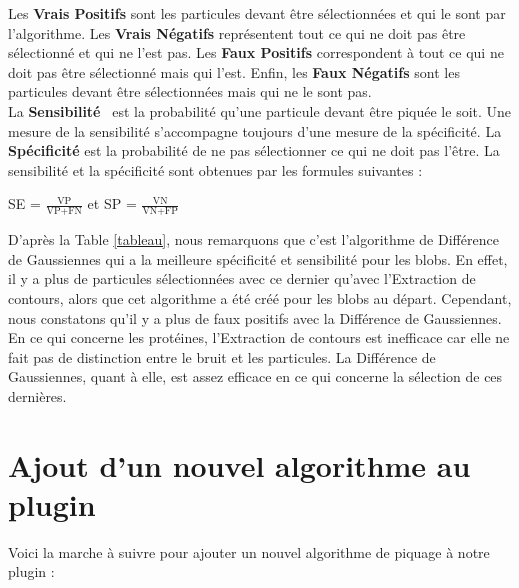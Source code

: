 \pagebreak

Les \textbf{Vrais Positifs} sont les particules devant être sélectionnées et qui le sont par l'algorithme. Les \textbf{Vrais Négatifs} représentent tout ce qui ne doit pas être sélectionné et qui ne l'est pas. Les \textbf{Faux Positifs} correspondent à tout ce qui ne doit pas être sélectionné mais qui l'est. Enfin, les \textbf{Faux Négatifs} sont les particules devant être sélectionnées mais qui ne le sont pas. \\ 
La \textbf{Sensibilité}~\cite{stats:url} est la probabilité qu'une particule devant être piquée le soit. Une mesure de la sensibilité s'accompagne toujours d'une mesure de la spécificité. La \textbf{Spécificité} est la probabilité de ne pas sélectionner ce qui ne doit pas l'être. La sensibilité et la spécificité sont obtenues par les formules suivantes : \\

\begin{center}
SE = $\frac{\text{VP}}{\text{VP+FN}}$ et SP = $\frac{\text{VN}}{\text{VN+FP}}$ \\
\end{center}

D'après la Table \ref{tableau}, nous remarquons que c'est l'algorithme de Différence de Gaussiennes qui a la meilleure spécificité et sensibilité pour les blobs. En effet, il y a plus de particules sélectionnées avec ce dernier qu'avec l'Extraction de contours, alors que cet algorithme a été créé pour les blobs au départ. Cependant, nous constatons qu'il y a plus de faux positifs avec la Différence de Gaussiennes. \\
En ce qui concerne les protéines, l'Extraction de contours est inefficace car elle ne fait pas de distinction entre le bruit et les particules. La Différence de Gaussiennes, quant à elle, est assez efficace en ce qui concerne la sélection de ces dernières. 

\section{Ajout d'un nouvel algorithme au plugin}

Voici la marche à suivre pour ajouter un nouvel algorithme de piquage à notre plugin :

